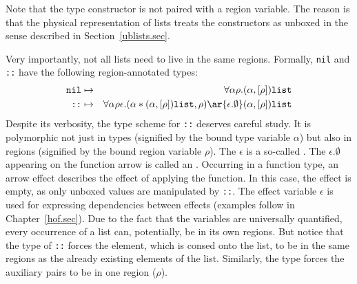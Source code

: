\documentclass[12pt]{book}
\begin{document}
Note that the  type constructor is not paired with a region variable.
The reason is that the physical representation of lists treats the constructors
as unboxed in the sense described in Section~\ref{ublists.sec}.

Very importantly, not all lists need to live in the same regions.
Formally, {\tt nil} and {\tt ::} have the following region-annotated types:
\begin{eqnarray*}
\boxml{nil} & \mapsto & \forall\alpha\rho.(\alpha,[\rho])\boxml{list}\\
\boxml{::}  & \mapsto & \forall\alpha\rho\epsilon.(\alpha\ast(\alpha,[\rho])\boxml{list},\rho)
\ar{\epsilon.\emptyset} (\alpha,[\rho])\boxml{list}
\end{eqnarray*}
Despite its verbosity, 
the type scheme for {\tt ::} deserves careful study. It is polymorphic not just in types
(signified by the bound type variable $\alpha$) but also in  regions (signified by the 
bound region variable $\rho$). The $\epsilon$ is a so-called . 
The $\epsilon.\emptyset$ appearing on the function arrow is called an .
Occurring in a function type, an arrow effect describes the effect of applying the function.
In this case, the effect is empty, as only unboxed values are manipulated by {\tt ::}. The effect variable $\epsilon$ 
is used for expressing dependencies between effects (examples follow in Chapter~\ref{hof.sec}). Due to the fact that 
the variables are universally quantified, every occurrence of a list can, potentially, be in its own regions. But notice 
that the type of {\tt ::} forces the element, which is consed onto the list, to be in the same regions 
as the already existing elements of the list. Similarly, the type forces the auxiliary pairs to be in
one region ($\rho$).
\end{document}
